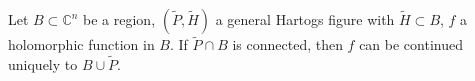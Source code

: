 Let $B \subset \mathbb{C}^n$ be a region, $(\tilde{P}, \tilde{H})$ a general Hartogs figure with $\tilde{H} \subset B$, $f$ a holomorphic function in $B$. If $\tilde{P} \cap B$ is connected, then $f$ can be continued uniquely to $B \cup \tilde{P}$.
